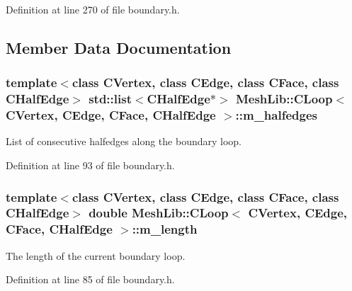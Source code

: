 Definition at line 270 of file boundary.\+h.



\subsection{Member Data Documentation}
\subsubsection[{\texorpdfstring{m\+\_\+halfedges}{m_halfedges}}]{\setlength{\rightskip}{0pt plus 5cm}template$<$class C\+Vertex, class C\+Edge, class C\+Face, class C\+Half\+Edge$>$ std\+::list$<${\bf C\+Half\+Edge}$\ast$$>$ {\bf Mesh\+Lib\+::\+C\+Loop}$<$ {\bf C\+Vertex}, {\bf C\+Edge}, {\bf C\+Face}, {\bf C\+Half\+Edge} $>$\+::m\+\_\+halfedges\hspace{0.3cm}{\ttfamily [protected]}}\hypertarget{class_mesh_lib_1_1_c_loop_a52708198f9b27b7aba3f3df30f46bb5e}{}\label{class_mesh_lib_1_1_c_loop_a52708198f9b27b7aba3f3df30f46bb5e}
List of consecutive halfedges along the boundary loop. 

Definition at line 93 of file boundary.\+h.

\subsubsection[{\texorpdfstring{m\+\_\+length}{m_length}}]{\setlength{\rightskip}{0pt plus 5cm}template$<$class C\+Vertex, class C\+Edge, class C\+Face, class C\+Half\+Edge$>$ double {\bf Mesh\+Lib\+::\+C\+Loop}$<$ {\bf C\+Vertex}, {\bf C\+Edge}, {\bf C\+Face}, {\bf C\+Half\+Edge} $>$\+::m\+\_\+length\hspace{0.3cm}{\ttfamily [protected]}}\hypertarget{class_mesh_lib_1_1_c_loop_a3886caa41e199204666ca08dcf90f847}{}\label{class_mesh_lib_1_1_c_loop_a3886caa41e199204666ca08dcf90f847}
The length of the current boundary loop. 

Definition at line 85 of file boundary.\+h.

